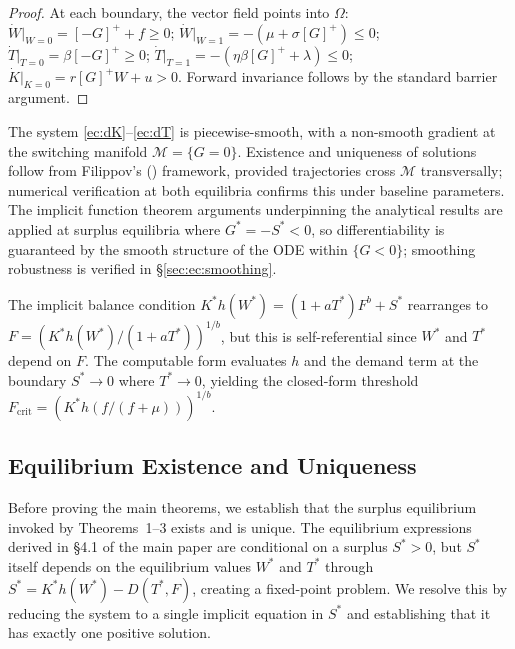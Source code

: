 \documentclass[msom,dblanonrev]{informs4}
\newcommand{\Gp}{[G]^{+}}
\newcommand{\Gm}{[-G]^{+}}
\begin{document}
\begin{proof}
At each boundary, the vector field points into $\Omega$: $\dot W|_{W=0} = \Gm + f \geq 0$; $\dot W|_{W=1} = -(\mu + \sigma\Gp) \leq 0$; $\dot T|_{T=0} = \beta\Gm \geq 0$; $\dot T|_{T=1} = -(\eta\beta\Gp + \lambda) \leq 0$; $\dot K|_{K=0} = r\Gp W + u > 0$. Forward invariance follows by the standard barrier argument.\Halmos
\end{proof}

\begin{remark}\label{rem:pwsmooth}
The system \eqref{ec:dK}--\eqref{ec:dT} is piecewise-smooth, with a non-smooth gradient at the switching manifold $\mathcal{M} = \{G = 0\}$. Existence and uniqueness of solutions follow from Filippov's (\citeyear{filippov1988differential}) framework, provided trajectories cross $\mathcal{M}$ transversally; numerical verification at both equilibria confirms this under baseline parameters. The implicit function theorem arguments underpinning the analytical results are applied at surplus equilibria where $G^* = -S^* < 0$, so differentiability is guaranteed by the smooth structure of the ODE within $\{G < 0\}$; smoothing robustness is verified in \S\ref{sec:ec:smoothing}.
\end{remark}

\begin{remark}\label{rem:Fcrit_implicit}
The implicit balance condition $K^*h(W^*)=(1+aT^*)F^b+S^*$ rearranges to $F=(K^*h(W^*)/(1+aT^*))^{1/b}$, but this is self-referential since $W^*$ and $T^*$ depend on $F$. The computable form evaluates $h$ and the demand term at the boundary $S^*\to 0$ where $T^*\to 0$, yielding the closed-form threshold $F_{\mathrm{crit}} = (K^* h(f/(f+\mu)))^{1/b}$.
\end{remark}

\subsection{Equilibrium Existence and Uniqueness}\label{sec:ec:existence}

Before proving the main theorems, we establish that the surplus equilibrium invoked by Theorems~1--3 exists and is unique. The equilibrium expressions derived in \S4.1 of the main paper are conditional on a surplus $S^* > 0$, but $S^*$ itself depends on the equilibrium values $W^*$ and $T^*$ through $S^* = K^* h(W^*) - D(T^*, F)$, creating a fixed-point problem. We resolve this by reducing the system to a single implicit equation in $S^*$ and establishing that it has exactly one positive solution.
\end{document}
